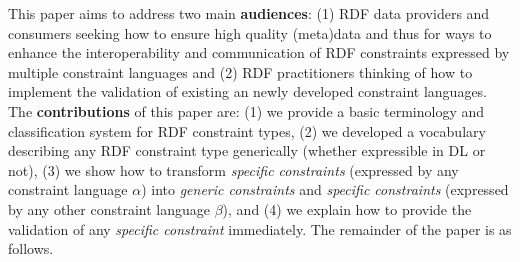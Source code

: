 \documentclass{llncs}
\newcommand{\ms}[1]{\texttt{#1}}
\begin{document}
This paper aims to address two main \textbf{audiences}:
(1) RDF data providers and consumers seeking how to ensure high quality (meta)data and thus for ways to enhance the interoperability and communication of RDF constraints expressed by multiple constraint languages and  
(2) RDF practitioners thinking of how to implement the validation of existing an newly developed constraint languages.
The \textbf{contributions} of this paper are:
(1) we provide a basic terminology and classification system for RDF constraint types,
(2) we developed a vocabulary describing any RDF constraint type generically (whether expressible in DL or not),
(3) we show how to transform \emph{specific constraints} (expressed by any constraint language \ms{$\alpha$}) into \emph{generic constraints} and \emph{specific constraints} (expressed by any other constraint language \ms{$\beta$}), and
(4) we explain how to provide the validation of any \emph{specific constraint} immediately. 
The remainder of the paper is as follows.

\end{document}

